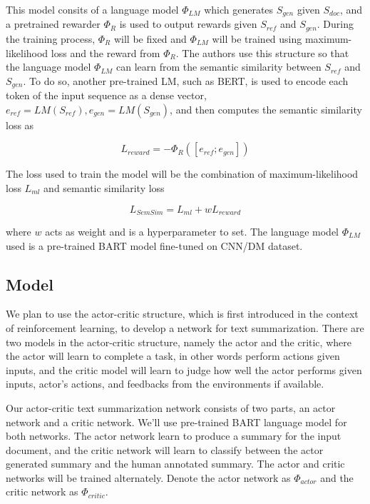 \documentclass[11pt,a4paper]{article}
\begin{document}
This model consits of a language model $\Phi_{LM}$ which generates $S_{gen}$ given $S_{doc}$, and a pretrained rewarder $\Phi_{R}$ is used to output rewards given $S_{ref}$ and $S_{gen}$. During the training process, $\Phi_{R}$ will be fixed and $\Phi_{LM}$ will be trained using maximum-likelihood loss and the reward from $\Phi_{R}$. The authors use this structure so that the language model $\Phi_{LM}$ can learn from the semantic similarity between $S_{ref}$ and $S_{gen}$. To do so, another pre-trained LM, such as BERT, is used to encode each token of the input sequence as a dense vector, $e_{ref}=LM(S_{ref}), e_{gen}=LM(S_{gen})$, and then computes the semantic similarity loss as

\begin{equation}
    L_{reward} = -\Phi_{R}([e_{ref}; e_{gen}])
\end{equation}

The loss used to train the model will be the combination of maximum-likelihood loss $L_{ml}$ and semantic similarity loss

\begin{equation}
    L_{SemSim} = L_{ml} + wL_{reward}
\end{equation}

where $w$ acts as weight and is a hyperparameter to set. The language model $\Phi_{LM}$ used is a pre-trained BART model fine-tuned on CNN/DM dataset.

\subsection{Model}
We plan to use the actor-critic structure, which is first introduced in the context of reinforcement learning\cite{konda2000actor}, to develop a network for text summarization. There are two models in the actor-critic structure, namely the actor and the critic, where the actor will learn to complete a task, in other words perform actions given inputs, and the critic model will learn to judge how well the actor performs given inputs, actor's actions, and feedbacks from the environments if available.

Our actor-critic text summarization network consists of two parts, an actor network and a critic network. We'll use pre-trained BART language model for both networks. The actor network learn to produce a summary for the input document, and the critic network will learn to classify between the actor generated summary and the human annotated summary. The actor and critic networks will be trained alternately. Denote the actor network as $\Phi_{actor}$ and the critic network as $\Phi_{critic}$.
\end{document}
